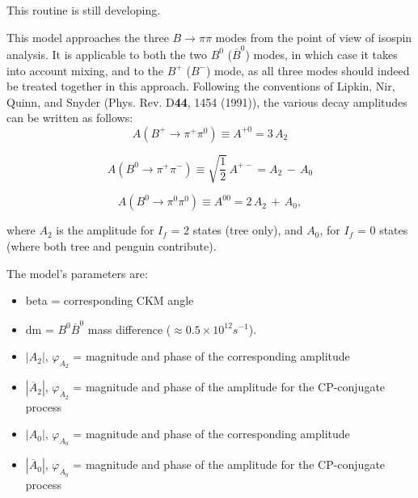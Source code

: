 \Notes
This routine is still developing.



\label{bto2picpiso}



\Expl
This model approaches the three $B \rightarrow \pi \pi$ modes from the point of view of isospin analysis.  It is applicable to both the two $B^{0}$ ($\overline{B}^{0}$) modes, in which case it takes into account mixing, and to the $B^{+}$ ($B^{-}$) mode, as all three modes should indeed be treated together in this approach.  Following the conventions of Lipkin, Nir, Quinn, and Snyder (Phys. Rev. D{\bf 44}, 1454 (1991)), the various decay amplitudes can be written as follows:
\begin{equation}
A(B^{+} \rightarrow \pi^{+} \pi^{0}) \equiv A^{+0} = 3\,A_{2} 
\end{equation}  

\begin{equation}
A(B^{0} \rightarrow \pi^{+} \pi^{-}) \equiv \sqrt{\frac{1}{2}} \,A^{+-} = A_{2}\,- \,A_{0}
\end{equation} 

\begin{equation}
A(B^{0} \rightarrow \pi^{0} \pi^{0}) \equiv A^{00} = 2\,A_{2}\, +\,A_{0},  
\end{equation}

where $A_{2}$ is the amplitude for $I_{f}$ = 2 states (tree only), and $A_{0}$, for $I_{f}$ = 0 states (where both tree and penguin contribute).  

The model's parameters are:
\begin{itemize}
\item
beta = corresponding CKM angle
\item
dm = $B^{0} \overline{B}^{0}$ mass difference ($\approx 0.5 \times 10^{12} s^{-1}$).  
\item
$|A_{2}|$, $\varphi_{A_{2}}$  = magnitude and phase of the corresponding amplitude
\item
$|\overline{A}_{2}|$, $\varphi_{\overline{A}_{2}}$ = magnitude and phase of the amplitude for the CP-conjugate process
\item
$|A_{0}|$, $\varphi_{A_{0}}$  = magnitude and phase of the corresponding amplitude
\item
$|\overline{A}_{0}|$, $\varphi_{\overline{A}_{0}}$ = magnitude and phase of the amplitude for the CP-conjugate process
\end{itemize}


